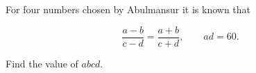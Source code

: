 For four numbers chosen by Abulmansur it is known that

\[
\dfrac{a-b}{c-d}=\dfrac{a+b}{c+d},
\qquad
ad=60.
\]

Find the value of $abcd$.
